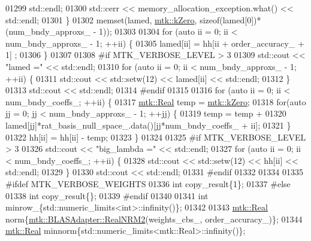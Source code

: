 \begin{DoxyCode}
{{01299         std::endl;
01300       std::cerr << memory\_allocation\_exception.what() << std::endl;
01301     \}
01302     memset(lamed, \hyperlink{group__c01-roots_ga59a451a5fae30d59649bcda274fea271}{mtk::kZero}, \textcolor{keyword}{sizeof}(lamed[0])*(num\_bndy\_approxs\_ - 1));
01303 
01304     \textcolor{keywordflow}{for} (\textcolor{keyword}{auto} ii = 0; ii < num\_bndy\_approxs\_ - 1; ++ii) \{
01305       lamed[ii] = hh[ii + order\_accuracy\_ + 1] ;
01306     \}
01307 
01308 \textcolor{preprocessor}{    #if MTK\_VERBOSE\_LEVEL > 3}
01309     std::cout << \textcolor{stringliteral}{"lamed ="} << std::endl;
01310     \textcolor{keywordflow}{for} (\textcolor{keyword}{auto} ii = 0; ii < num\_bndy\_approxs\_ - 1; ++ii) \{
01311       std::cout << std::setw(12) << lamed[ii] << std::endl;
01312     \}
01313     std::cout << std::endl;
01314 \textcolor{preprocessor}{    #endif}
01315 
01316     \textcolor{keywordflow}{for} (\textcolor{keyword}{auto} ii = 0; ii < num\_bndy\_coeffs\_; ++ii) \{
01317       \hyperlink{group__c01-roots_gac080bbbf5cbb5502c9f00405f894857d}{mtk::Real} temp = \hyperlink{group__c01-roots_ga59a451a5fae30d59649bcda274fea271}{mtk::kZero};
01318       \textcolor{keywordflow}{for}(\textcolor{keyword}{auto} jj = 0; jj < num\_bndy\_approxs\_ - 1; ++jj) \{
01319         temp = temp +
01320           lamed[jj]*rat\_basis\_null\_space\_.data()[jj*num\_bndy\_coeffs\_ + ii];
01321       \}
01322       hh[ii] = hh[ii] - temp;
01323     \}
01324 
01325 \textcolor{preprocessor}{    #if MTK\_VERBOSE\_LEVEL > 3}
01326     std::cout << \textcolor{stringliteral}{"big\_lambda ="} << std::endl;
01327     \textcolor{keywordflow}{for} (\textcolor{keyword}{auto} ii = 0; ii < num\_bndy\_coeffs\_; ++ii) \{
01328       std::cout << std::setw(12) << hh[ii] << std::endl;
01329     \}
01330     std::cout << std::endl;
01331 \textcolor{preprocessor}{    #endif}
01332 
01334 
01335 \textcolor{preprocessor}{    #ifdef MTK\_VERBOSE\_WEIGHTS}
01336     \textcolor{keywordtype}{int} copy\_result\{1\};
01337 \textcolor{preprocessor}{    #else}
01338     \textcolor{keywordtype}{int} copy\_result\{\};
01339 \textcolor{preprocessor}{    #endif}
01340 
01341     \textcolor{keywordtype}{int} minrow\_\{std::numeric\_limits<int>::infinity()\};
01342 
01343     \hyperlink{group__c01-roots_gac080bbbf5cbb5502c9f00405f894857d}{mtk::Real} norm\{\hyperlink{classmtk_1_1BLASAdapter_ab92440888b730863244c5d9479c11aca}{mtk::BLASAdapter::RealNRM2}(weights\_cbs\_,
      order\_accuracy\_)\};
01344     \hyperlink{group__c01-roots_gac080bbbf5cbb5502c9f00405f894857d}{mtk::Real} minnorm\{std::numeric\_limits<mtk::Real>::infinity()\};
}}
\end{DoxyCode}
